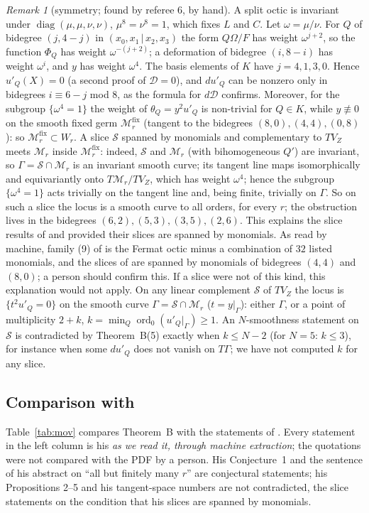\documentclass[11pt]{article}
\numberwithin{equation}{section}
\theoremstyle{remark}
\newtheorem{remark}[theorem]{Remark}
\newcommand{\VZ}{V_Z}
\newcommand{\cD}{\mathcal{D}}
\newcommand{\cM}{\mathcal{M}}
\begin{document}
\begin{remark}[symmetry; found by referee 6, by hand]\label{rem:sym}
A split octic is invariant under $\operatorname{diag}(\mu,\mu,\nu,\nu)$, $\mu^8=\nu^8=1$, which fixes $L$ and
$C$. Let $\omega=\mu/\nu$. For $Q$ of bidegree $(j,4-j)$ in $(x_0,x_1\,|\,x_2,x_3)$ the form $Q\Omega/F$ has
weight $\omega^{j+2}$, so the function $\Phi_Q$ has weight $\omega^{-(j+2)}$; a deformation of bidegree
$(i,8-i)$ has weight $\omega^i$, and $y$ has weight $\omega^4$. The basis elements of $K$ have $j=4,1,3,0$.
Hence $u'_Q(X)=0$ (a second proof of $\cD=0$), and $du'_Q$ can be nonzero only in bidegrees $i\equiv6-j$ mod
$8$, as the formula for $d\cD$ confirms. Moreover, for the subgroup $\{\omega^4=1\}$ the weight of
$\theta_Q=y^2u'_Q$ is non-trivial for $Q\in K$, while $y\not\equiv0$ on the smooth fixed germ
$\cM_r^{\mathrm{fix}}$ (tangent to the bidegrees $(8,0),(4,4),(0,8)$): so $\cM_r^{\mathrm{fix}}\subset W_r$. A
slice $\mathcal S$ spanned by monomials and complementary to $T\VZ$ meets $\cM_r$ inside $\cM_r^{\mathrm{fix}}$:
indeed, $\mathcal S$ and $\cM_r$ (with bihomogeneous $Q'$) are invariant, so $\Gamma=\mathcal S\cap\cM_r$ is an
invariant smooth curve; its tangent line maps isomorphically and equivariantly onto $T\cM_r/T\VZ$, which has
weight $\omega^4$; hence the subgroup $\{\omega^4=1\}$ acts trivially on the tangent line and, being finite,
trivially on $\Gamma$. So on such a slice the locus is a smooth curve to all orders, for every $r$; the
obstruction lives in the bidegrees $(6,2),(5,3),(3,5),(2,6)$. This explains the slice results of
\cite[Thm~2]{Mo21} and \cite{Mo26} provided their slices are spanned by monomials. As read by machine, family
(9) of \cite{Mo21} is the Fermat octic minus a combination of $32$ listed monomials, and the slices of
\cite{Mo26} are spanned by monomials of bidegrees $(4,4)$ and $(8,0)$; a person should confirm this. If a slice
were not of this kind, this explanation would not apply. On any linear complement $\mathcal S$ of $T\VZ$ the
locus is $\{t^2u'_Q=0\}$ on the smooth curve $\Gamma=\mathcal S\cap\cM_r$ ($t=y|_\Gamma$): either $\Gamma$, or a
point of multiplicity $2+k$, $k=\min_Q\operatorname{ord}_0(u'_Q|_\Gamma)\ge1$. An $N$-smoothness statement on
$\mathcal S$ is contradicted by Theorem~B(5) exactly when $k\le N-2$ (for $N=5$: $k\le3$), for instance when
some $du'_Q$ does not vanish on $T\Gamma$; we have not computed $k$ for any slice.
\end{remark}

\subsection{Comparison with \texorpdfstring{\cite{Mo26}}{Movasati's preprint}}
Table~\ref{tab:mov} compares Theorem~B with the statements of \cite{Mo26}. Every statement in the left column is
his \emph{as we read it, through machine extraction}; the quotations were not compared with the PDF by a person.
His Conjecture~1 and the sentence of his abstract on ``all but finitely many $r$'' are conjectural statements;
his Propositions 2--5 and his tangent-space numbers are not contradicted, the slice statements on the condition
that his slices are spanned by monomials.
\end{document}
